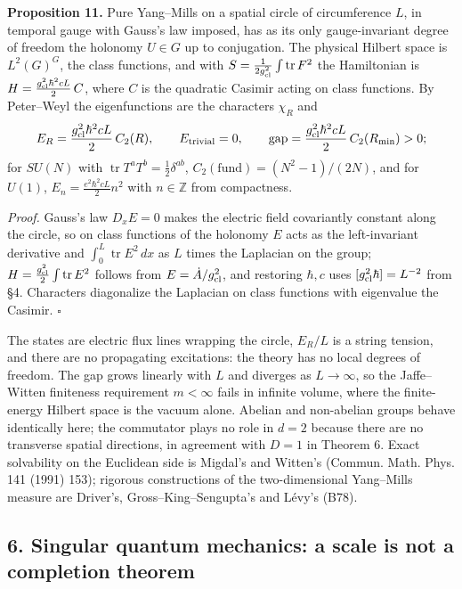 \documentclass[11pt,a4paper]{article}
\begin{document}
\textbf{Proposition 11.} Pure Yang--Mills on a spatial circle of
circumference \(L\), in temporal gauge with Gauss's law imposed, has as
its only gauge-invariant degree of freedom the holonomy \(U\in G\) up to
conjugation. The physical Hilbert space is \(L^2(G)^G\), the class
functions, and with \(S=\frac1{2g_{\rm cl}^2}\int\operatorname{tr}F^2\)
the Hamiltonian is \(H=\frac{g_{\rm cl}^2\hbar^2cL}{2}\,C\), where \(C\)
is the quadratic Casimir acting on class functions. By Peter--Weyl the
eigenfunctions are the characters \(\chi_R\) and
\[E_R=\frac{g_{\rm cl}^2\hbar^2cL}{2}\,C_2(R),\qquad
E_{\rm trivial}=0,\qquad
\text{gap}=\frac{g_{\rm cl}^2\hbar^2cL}{2}\,C_2(R_{\min})>0 ;\] for
\(SU(N)\) with \(\operatorname{tr}T^aT^b=\tfrac12\delta^{ab}\),
\(C_2(\text{fund})=(N^2-1)/(2N)\), and for \(U(1)\),
\(E_n=\frac{e^2\hbar^2cL}{2}n^2\) with \(n\in\mathbb Z\) from
compactness.

\emph{Proof.} Gauss's law \(D_xE=0\) makes the electric field
covariantly constant along the circle, so on class functions of the
holonomy \(E\) acts as the left-invariant derivative and
\(\int_0^L\operatorname{tr}E^2\,dx\) as \(L\) times the Laplacian on the
group; \(H=\frac{g_{\rm cl}^2}{2}\int\operatorname{tr}E^2\) follows from
\(E=\dot A/g_{\rm cl}^2\), and restoring \(\hbar,c\) uses
\([g_{\rm cl}^2\hbar]=L^{-2}\) from §4. Characters diagonalize the
Laplacian on class functions with eigenvalue the Casimir. \(\square\)

The states are electric flux lines wrapping the circle, \(E_R/L\) is a
string tension, and there are no propagating excitations: the theory has
no local degrees of freedom. The gap grows linearly with \(L\) and
diverges as \(L\to\infty\), so the Jaffe--Witten finiteness requirement
\(m<\infty\) fails in infinite volume, where the finite-energy Hilbert
space is the vacuum alone. Abelian and non-abelian groups behave
identically here; the commutator plays no role in \(d=2\) because there
are no transverse spatial directions, in agreement with \(D=1\) in
Theorem 6. Exact solvability on the Euclidean side is Migdal's and
Witten's (Commun. Math. Phys. 141 (1991) 153); rigorous constructions of
the two-dimensional Yang--Mills measure are Driver's,
Gross--King--Sengupta's and Lévy's (B78).

\hypertarget{singular-quantum-mechanics-a-scale-is-not-a-completion-theorem}{%
\subsection{6. Singular quantum mechanics: a scale is not a completion
theorem}\label{singular-quantum-mechanics-a-scale-is-not-a-completion-theorem}}
\end{document}
